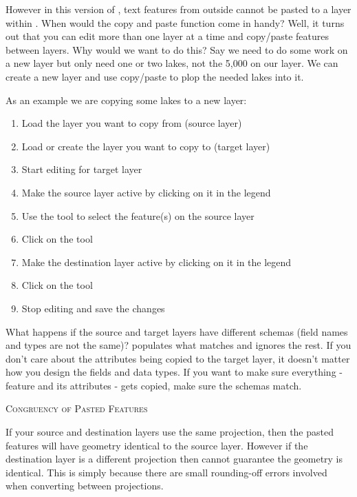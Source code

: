 However in this version of \qg, text features from outside \qg cannot
be pasted to a layer within \qg. When would the copy and paste function
come in handy? Well, it turns out that you can edit more than one layer
at a time and copy/paste features between layers. Why would we want to do
this?  Say we need to do some work on a new layer but only need one or
two lakes, not the 5,000 on our  layer. We can create
a new layer and use copy/paste to plop the needed lakes into it.

As an example we are copying some lakes to a new layer:

\begin{enumerate}
\item Load the layer you want to copy from (source layer)
\item Load or create the layer you want to copy to (target layer)
\item Start editing for target layer
\item Make the source layer active by clicking on it in the legend
\item Use the  tool to select the feature(s) on the source layer
\item Click on the  tool
\item Make the destination layer active by clicking on it in the legend
\item Click on the  tool
\item Stop editing and save the changes
\end{enumerate}

What happens if the source and target layers have
different schemas (field names and types are not the same)? \qg populates
what matches and ignores the rest. If you don't care about the attributes
being copied to the target layer, it doesn't matter how you design the
fields and data types. If you want to make sure everything - feature and its
attributes - gets copied, make sure the schemas match.

\begin{Tip}\caption{\textsc{Congruency of Pasted Features}}
If your source and destination layers use the
same projection, then the pasted features will have
geometry identical to the source layer.
However if the destination layer is a different projection
then \qg cannot guarantee the geometry is identical.
This is simply because there are small rounding-off errors
involved when converting between projections.
\end{Tip}

